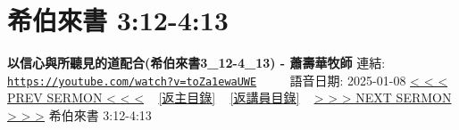 \documentclass{book}
\begin{document}
\section{希伯來書 3:12-4:13}
\label{sec:toZa1ewaUWE}
\textbf{以信心與所聽見的道配合(希伯來書3\_12-4\_13) - 蕭壽華牧師}
\newline
\newline
連結: \href{https://youtube.com/watch?v=toZa1ewaUWE}{\texttt{https://youtube.com/watch?v=toZa1ewaUWE}} ~~~~ 語音日期: 2025-01-08
\newline
\newline
\hyperref[sec:rP3BCIuRFDw]{< < < PREV SERMON < < <}
~
\hyperlink{toc}{[返主目錄]}
~
\hyperref[ch:preacher9]{[返講員目錄]}
~
\hyperref[sec:8LlYAk0Xlok]{> > > NEXT SERMON > > >}
\newline
\newline
希伯來書 3:12-4:13
\newline
\end{document}
